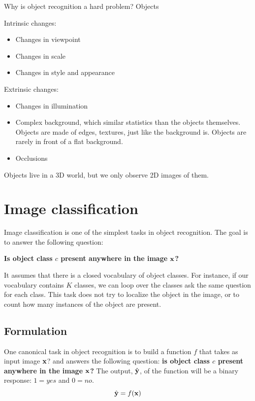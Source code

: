 Why is object recognition a hard problem? Objects

Intrinsic changes:
\begin{itemize}
	\item Changes in viewpoint
	\item Changes in scale
	\item Changes in style and appearance
\end{itemize}

Extrinsic changes:
\begin{itemize}
	\item Changes in illumination
	\item Complex background, which similar statistics than the objects themselves. Objects are made of edges, textures, just like the background is. Objects are rarely in front of a flat background.
	\item Occlusions
\end{itemize}

Objects live in a 3D world, but we only observe 2D images of them.

\section{Image classification}


Image classification is one of the simplest tasks in object recognition. The goal is to answer the following question:

\centerline{
	{\bf Is object class $c$ present anywhere in the image $\bf x$?}
}

It assumes that there is a closed vocabulary of object classes. For instance, if our vocabulary contains $K$ classes, we can loop over the classes ask the same question for each class. This task does not try to localize the object in the image, or to count how many instances of the object are present.

\subsection{Formulation}

One canonical task in object recognition is to build a function $f$ that takes as input image $\bf x$? and answers the following question: {\bf is object class $c$ present anywhere in the image $\bf x$?} The output, $\hat {\bf y}$, of the function will be a binary response: $1=yes$ and $0=no$.
\begin{equation}
	\hat {\bf y} = f({\bf x})
\end{equation}

